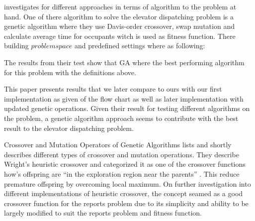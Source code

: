 \cite{ahmed2022investigation} investigates for different approaches in terms of algorithm to the problem at hand.  One of there algorithm to solve the elevator dispatching problem is a genetic algorithm where they use Davis-order crossover, swap mutation and calculate average time for occupants  witch is used as fitness function. There building \( problem space \) and predefined settings where as following:

The results from their test show that GA where the best performing algorithm for this problem with the definitions above.

This paper presents results that we later compare to ours with our first implementation as given of the flow chart \cite{tartan2016genetic} as well as later implementation with updated genetic operations. Given their result for testing different algorithms on the problem, a genetic algorithm approach seems to contribute with the best result to the elevator dispatching problem.

Crossover and Mutation Operators of Genetic Algorithms \cite{lim2017crossover} lists and shortly describes different types of crossover and mutation operations. They describe Wright's heuristic crossover and categorized it as one of the crossover functions how’s offspring are “in the exploration region near the parents” \cite{lim2017crossover} . This reduce premature offspring by overcoming local maximum. On further investigation into different implementations of heuristic crossover, the concept seamed as a good crossover function for the reports problem due to its simplicity and ability to be largely modified to suit the reports problem and fitness function.


